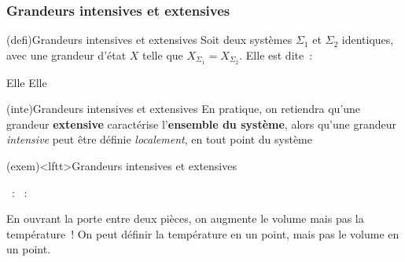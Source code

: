 \documentclass[../../main/main.tex]{subfiles}
\begin{document}
\subsubsection{Grandeurs intensives et extensives}
\begin{tcb*}(defi){Grandeurs intensives et extensives}
	Soit deux systèmes $\Sigma_1$ et $\Sigma_2$ identiques, avec une grandeur
	d'état $X$ telle que $X_{\Sigma_1} = X_{\Sigma_2}$. Elle est
	dite~:
	\smallbreak
	\begin{isd}
		Elle %
		\vspace{-15pt}
		\tcblower
		Elle %
		\vspace{-15pt}
	\end{isd}
\end{tcb*}

\begin{tcb}(inte){Grandeurs intensives et extensives}
	En pratique, on retiendra qu'une grandeur \textbf{extensive} caractérise
	l'\textbf{ensemble du système}, alors qu'une grandeur \textit{intensive} peut
	être définie \textit{localement}, en tout point du système
\end{tcb}

\begin{tcb}(exem)<lftt>{Grandeurs intensives et extensives}
	\begin{itemize}
		~: 
		~: 
	\end{itemize}
	En ouvrant la porte entre deux pièces, on augmente le volume mais pas la
	température~! On peut définir la température en un point, mais pas le volume
	en un point.
\end{tcb}
\end{document}
